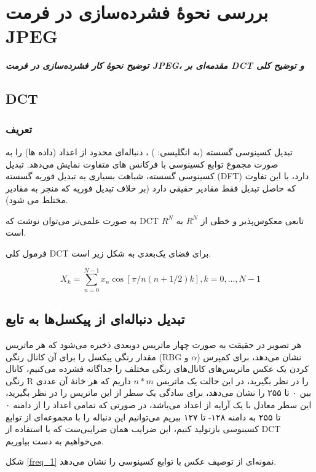 \chapter{بررسی نحوهٔ فشرده‌سازی در فرمت JPEG}
\noindent
\textbf{
	\textit{
        توضیح نحوهٔ کار فشرده‌سازی در فرمت JPEG، 
        مقدمه‌ای بر DCT و 
        توضیح کلی 
	}
}
\pagebreak

\section{DCT}

\subsection{
تعریف 
}

تبدیل کسینوسی گسسته (به انگلیسی:
 )
 ، دنباله‌ای محدود از اعداد (داده ها) را به‌ صورت مجموع توابع کسینوسی با فرکانس های متفاوت نمایش می‌دهد.
 تبدیل کسینوسی گسسته، شباهت بسیاری به تبدیل فوریه گسسته (DFT) دارد، با این تفاوت که حاصل تبدیل فقط مقادیر حقیقی دارد (بر خلاف تبدیل فوریه که منجر به مقادیر مختلط می شود).

 به صورت علمی‌تر می‌توان نوشت که 
 DCT 
 تابعی معکوس‌پذیر و خطی از 
 $R^N$ 
 به 
 $R^N$
 است.

 فرمول کلی DCT 
 برای فضای یک‌بعدی به شکل زیر است.

 \begin{equation}
 X_k = \sum_{n = 0}^{N - 1} x_n \cos [\pi / n  (n + 1/2)k]
 , k = 0, ..., N - 1
 \end{equation}

 \section{تبدیل دنباله‌ای از پیکسل‌ها به تابع}
هر تصویر در حقیقت به صورت چهار ماتریس دوبعدی ذخیره می‌شود که هر ماتریس مقدار رنگی پیکسل را برای آن کانال رنگی
(RBG و $\alpha$)
نشان می‌دهد، برای کمپرس کردن یک عکس ماتریس‌های کانال‌های رنگی مختلف را جداگانه فشرده می‌کنیم، کانال رنگی R 
را در نظر بگیرید، در این حالت یک ماتریس 
$n * m$ 
داریم که هر خانهٔ آن عددی بین ۰ تا ۲۵۵ را نشان می‌دهد، برای سادگی یک سطر از این ماتریس را در نظر بگیرید، این سطر معادل با یک 
آرایه از اعداد می‌باشد، در صورتی که تمامی اعداد را از دامنه ۰ تا ۲۵۵ به دامنه ۱۲۸- تا ۱۲۷ ببریم می‌توانیم این دنباله را با مجموعه‌ای از 
توابع کسینوسی بازتولید کنیم، این ضرایب همان ضرایبی‌ست که با استفاده از DCT 
می‌خواهیم به دست بیاوریم.

شکل
\ref{freq_1}
نمونه‌ای از توصیف عکس با توابع کسینوسی را نشان می‌دهد.

